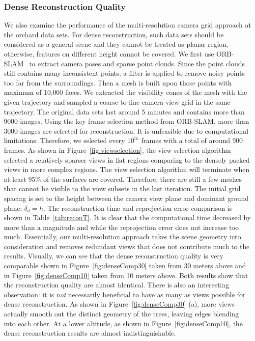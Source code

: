 \subsubsection{Dense Reconstruction Quality}
We also examine the performance of the multi-resolution camera grid approach at the orchard data sets. 
For dense reconstruction, such data sets should be considered as a general scene and they cannot be treated as planar region, otherwise, features on different height cannot be covered.
We first use ORB-SLAM~\cite{murORB2} to extract camera poses and sparse point clouds. Since the point clouds still contains many inconsistent points, a filter is applied to remove noisy points too far from the surroundings. Then a mesh is built upon those points with maximum of 10,000 faces. We extracted the visibility cones of the mesh with the given trajectory and sampled a coarse-to-fine camera view grid in the same trajectory. The original data sets last around 5 minutes and contains more than 9000 images. Using the key frame selection method from ORB-SLAM, more than 3000 images are selected for reconstruction. It is unfeasible due to computational limitations. Therefore, we selected every $10^{th}$ frames with a total of around 900 frames. 
As shown in Figure~\ref{fig:viewselection}, the view selection algorithm selected a relatively sparser views in flat regions comparing to the densely packed views in more complex regions. The view selection algorithm will terminate when at least $95\%$ of the surfaces are covered. Therefore, there are still a few meshes that cannot be visible to the view subsets in the last iteration. The initial grid spacing is set to the height between the camera view plane and dominant ground plane: $\delta_d = h$. 
The reconstruction time and reprojection error comparison is shown in Table~\ref{tab:reconT}. It is clear that the computational time decreased by more than a magnitude and while the reprojection error does not increase too much. Essentially, our multi-resolution approach takes the scene geometry into consideration and removes redundant views that does not contribute much to the results.  
Visually, we can see that the dense reconstruction quality is very comparable shown in Figure~\ref{fig:denseComp30} taken from 30 meters above and in Figure~\ref{fig:denseComp10} taken from 10 meters above. Both results show that the reconstruction quality are almost identical.   
There is also an interesting observation: it is \emph{not} necessarily beneficial to have as many as views possible for dense reconstruction. As shown in Figure~\ref{fig:denseComp30} (a), more views actually smooth out the distinct geometry of the trees, leaving edges blending into each other. At a lower altitude, as shown in Figure~\ref{fig:denseComp10}, the dense reconstruction results are almost indistinguishable. 

